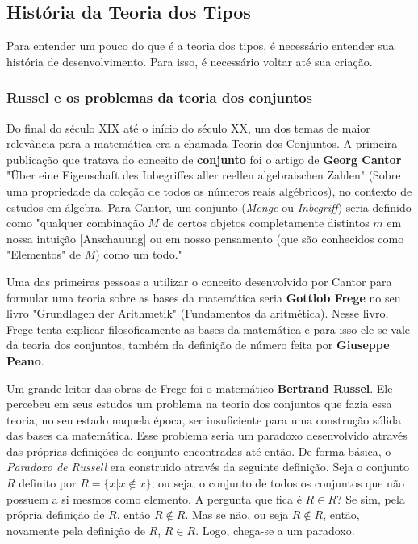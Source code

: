 \documentclass[../main.tex]{subfiles}
\begin{document}
\subsection{História da Teoria dos Tipos}

Para entender um pouco do que é a teoria dos tipos, é necessário entender sua história de desenvolvimento. Para isso, é necessário voltar até sua criação. \newline

\subsubsection{Russel e os problemas da teoria dos conjuntos}


Do final do século XIX até o início do século XX, um dos temas de maior relevância para a matemática era a chamada Teoria dos Conjuntos. A primeira publicação que tratava do conceito de \textbf{conjunto} foi o artigo de \textbf{Georg Cantor} "Über eine Eigenschaft des Inbegriffes aller reellen algebraischen Zahlen" (Sobre uma propriedade da coleção de todos os números reais algébricos), no contexto de estudos em álgebra. Para Cantor, um conjunto (\emph{Menge} ou \emph{Inbegriff}) seria definido como "qualquer combinação $M$ de certos objetos completamente distintos $m$ em nossa intuição [Anschauung] ou em nosso pensamento (que são conhecidos como "Elementos" de $M$) como um todo."


Uma das primeiras pessoas a utilizar o conceito desenvolvido por Cantor para formular uma teoria sobre as bases da matemática seria \textbf{Gottlob Frege} no seu livro "Grundlagen der Arithmetik" (Fundamentos da aritmética). Nesse livro, Frege tenta explicar filosoficamente as bases da matemática e para isso ele se vale da teoria dos conjuntos, também da definição de número feita por \textbf{Giuseppe Peano}.


Um grande leitor das obras de Frege foi o matemático \textbf{Bertrand Russel}. Ele percebeu em seus estudos um problema na teoria dos conjuntos que fazia essa teoria, no seu estado naquela época, ser insuficiente para uma construção sólida das bases da matemática. Esse problema seria um paradoxo desenvolvido através das próprias definições de conjunto encontradas até então. De forma básica, o \emph{Paradoxo de Russell} era construido através da seguinte definição. Seja o conjunto $R$ definito por $R = \{ x | x \notin x \}$, ou seja, o conjunto de todos os conjuntos que não possuem a si mesmos como elemento. A pergunta que fica é $R \in R$? Se sim, pela própria definição de $R$, então $R \notin R$. Mas se não, ou seja $R \notin R$, então, novamente pela definição de $R$, $R \in R$. Logo, chega-se a um paradoxo.
\end{document}
